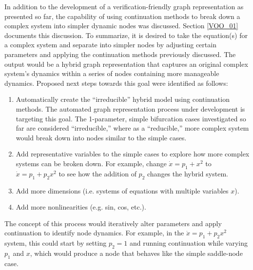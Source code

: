 \documentclass[12pt]{article}
\begin{document}
In addition to the development of a verification-friendly graph representation as presented so far, the capability of using continuation methods to break down a complex system into simpler dynamic nodes was discussed. Section \ref{VOO_01} documents this discussion. To summarize, it is desired to take the equation(s) for a complex system and separate into simpler nodes by adjusting certain parameters and applying the continuation methods previously discussed. The output would be a hybrid graph representation that captures an original complex system's dynamics within a series of nodes containing more manageable dynamics. Proposed next steps towards this goal were identified as follows:

\begin{enumerate}
\item Automatically create the ``irreducible'' hybrid model using continuation methods. The automated graph representation process under development is targeting this goal. The 1-parameter, simple bifurcation cases investigated so far are considered ``irreducible,'' where as a ``reducible,'' more complex system would break down into nodes similar to the simple cases.
\item Add representative variables to the simple cases to explore how more complex systems can be broken down. For example, change $\dot{x}=p_1+x^2$ to $\dot{x}=p_1+p_2x^2$ to see how the addition of $p_2$ changes the hybrid system.
\item Add more dimensions (i.e. systems of equations with multiple variables $x$). 
\item Add more nonlinearities (e.g. sin, cos, etc.).
\end{enumerate}

The concept of this process would iteratively alter parameters and apply continuation to identify node dynamics. For example, in the $\dot{x}=p_1+p_2x^2$ system, this could start by setting $p_2=1$ and running continuation while varying $p_1$ and $x$, which would produce a node that behaves like the simple saddle-node case.
\end{document}
